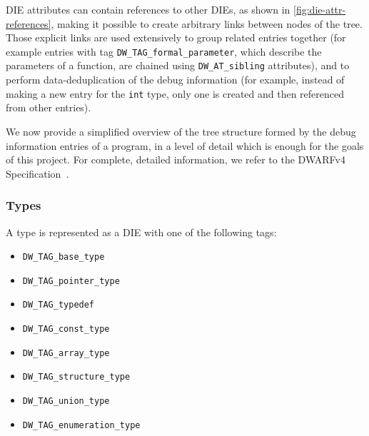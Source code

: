 DIE attributes can contain references to other DIEs, as shown in
\autoref{fig:die-attr-references}, making it possible to create arbitrary
links between nodes of the tree. Those explicit links are used extensively to
group related entries together (for example entries with tag
\verb|DW_TAG_formal_parameter|, which describe the parameters of a function,
are chained using \verb|DW_AT_sibling| attributes), and to perform
\gls{data-deduplication} of the debug information (for example, instead of
making a new entry for the \texttt{int} type, only one is created and
then referenced from other entries).


\label{sec:debuginfo-structure}

We now provide a simplified overview of the tree structure formed by the debug
information entries of a program, in a level of detail which is enough for the
goals of this project. For complete, detailed information, we refer to the
DWARFv4 Specification~\cite{dwarfspecv4}.


\subsubsection{Types}

A type is represented as a DIE with one of the following tags:

\begin{itemize}
  \item \verb|DW_TAG_base_type|
  \item \verb|DW_TAG_pointer_type|
  \item \verb|DW_TAG_typedef|
  \item \verb|DW_TAG_const_type|
  \item \verb|DW_TAG_array_type|
  \item \verb|DW_TAG_structure_type|
  \item \verb|DW_TAG_union_type|
  \item \verb|DW_TAG_enumeration_type|
\end{itemize}




